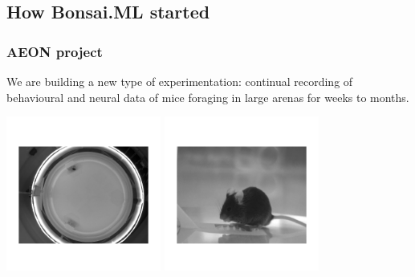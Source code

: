 \subsection{How Bonsai.ML started}

\begin{frame}
    \frametitle{AEON project}

    We are building a new type of experimentation:
    continual recording of behavioural and neural data of mice foraging in large
    arenas for weeks to months.

    \begin{center}
        \includegraphics[width=2in]{figures/foragingMouse.png}
        \includegraphics[width=2in]{figures/mouseOnWheel.png}
    \end{center}

\end{frame}

